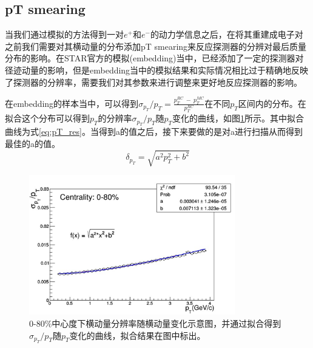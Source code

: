 \subsection{pT smearing}

当我们通过模拟的方法得到一对$e^+$和$e^-$的动力学信息之后，在将其重建成电子对之前我们需要对其横动量的分布添加pT smearing来反应探测器的分辨对最后质量分布的影响。在STAR官方的模拟(embedding)当中，已经添加了一定的探测器对径迹动量的影响，但是embedding当中的模拟结果和实际情况相比过于精确地反映了探测器的分辨率，需要我们对其参数来进行调整来更好地反应探测器的影响。

在embedding的样本当中，可以得到$\sigma_{p_T}/p_T = \frac{p_T^{RC}~-~p_T^{MC}}{p_T^{RC}}$在不同$p_T$区间内的分布。在拟合这个分布可以得到$p_T$的分辨率$\sigma_{p_T}/p_T$随$p_T$变化的曲线，如图\ref{fig:pT_res_embd}所示。其中拟合曲线为式\ref{eq:pT_res}。当得到a的值之后，接下来要做的是对a进行扫描从而得到最佳的a的值。
\begin{equation}
    \label{eq:pT_res}
    \delta_{p_T} = \sqrt{a^2 p_T^2 + b^2}
\end{equation}

\begin{figure}[htb]
    \begin{center}
    \includegraphics[width=0.8\textwidth,clip]{figures/Chapter4/pT_res_embd.png}
    \end{center}
    \caption[横动量分辨率随横动量变化示意图]{0-80\%中心度下横动量分辨率随横动量变化示意图，并通过拟合得到$\sigma_{p_T}/p_T$随$p_T$变化的曲线，拟合结果在图中标出。}
    \label{fig:pT_res_embd}
\end{figure}

